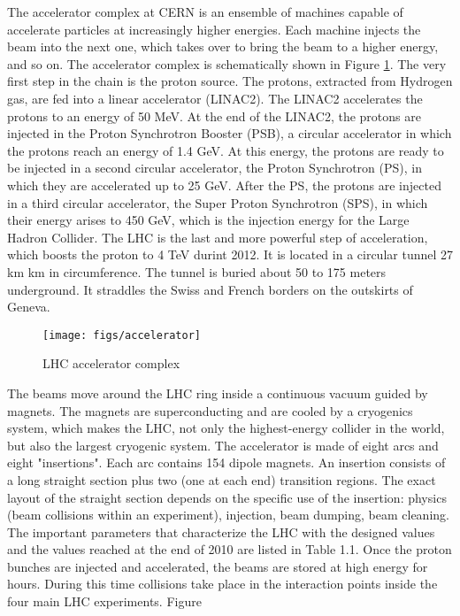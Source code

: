 The accelerator complex at CERN is an ensemble of machines capable of accelerate particles
at increasingly higher energies. Each machine injects the beam into the next one, which takes over to bring the beam to a higher energy, and so on. The accelerator complex
is schematically shown in Figure \ref{accl}. The very first step in the chain is the proton source. The protons, extracted from Hydrogen gas, are fed into a linear accelerator (LINAC2). The LINAC2 accelerates the protons to an energy of 50 MeV. At the end of the LINAC2, the protons are injected in the Proton Synchrotron Booster (PSB), a circular accelerator in which the protons reach an energy of 1.4 GeV. At this energy, the protons are ready to be injected in a second circular accelerator,
the Proton Synchrotron (PS), in which they are accelerated up to 25 GeV. After the PS, the
protons are injected in a third circular accelerator, the Super Proton Synchrotron (SPS), in
which their energy arises to 450 GeV, which is the injection energy for the Large Hadron
Collider. The LHC is the last and more powerful step of acceleration, which boosts the proton to
4 TeV durint 2012. It is located in a circular tunnel 27 km km in circumference. The tunnel is buried about
50 to 175 meters underground. It straddles the Swiss and French borders on the outskirts
of Geneva.

\begin{figure}[h]

\texttt{[image: figs/accelerator]}
\caption{
LHC accelerator complex
}
\label{accl}

\end{figure}



The beams move around the LHC ring inside a continuous vacuum guided by magnets.
The magnets are superconducting and are cooled by a cryogenics system, which makes
the LHC, not only the highest-energy collider in the world, but also the largest cryogenic
system.
The accelerator is made of eight arcs and eight "insertions". Each arc contains 154
dipole magnets. An insertion consists of a long straight section plus two (one at each end)
transition regions. The exact layout of the straight section depends on the specific use of
the insertion: physics (beam collisions within an experiment), injection, beam dumping,
beam cleaning. The important parameters that characterize the LHC with the designed
values and the values reached at the end of 2010 are listed in Table 1.1.
Once the proton bunches are injected and accelerated, the beams are stored at high
energy for hours. During this time collisions take place in the interaction points inside the
four main LHC experiments.
Figure





